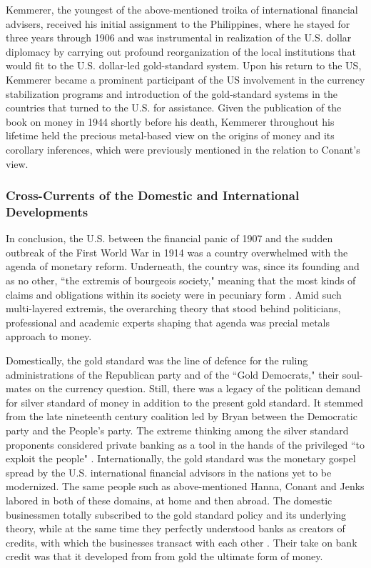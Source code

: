Kemmerer, the youngest of the above-mentioned troika of international financial advisers, received his initial assignment to the Philippines, where he stayed for three years through 1906 and was instrumental in realization of the U.S. dollar diplomacy by carrying out profound reorganization of the local institutions that would fit to the U.S. dollar-led gold-standard system. Upon his return to the US, Kemmerer became a prominent participant of the US involvement in the currency stabilization programs and introduction of the gold-standard systems in the countries that turned to the U.S. for assistance. Given the publication of the book on money in 1944  shortly before his death, Kemmerer throughout his lifetime held the precious metal-based view on the origins of money and its corollary inferences, which were previously mentioned in the relation to Conant's view.

\subsubsection*{Cross-Currents of the Domestic and International Developments}

In conclusion, the U.S. between the financial panic of 1907 and the sudden outbreak of the First World War in 1914 was a country overwhelmed with the agenda of monetary reform. Underneath, the country was, since its founding and as no other, ``the extremis of bourgeois society," meaning that the most kinds of claims and obligations within its society were in pecuniary form \citep[p.~9]{livingston1989}. Amid such multi-layered extremis, the overarching theory that stood behind politicians, professional and academic experts shaping that agenda was precial metals approach to money. 

Domestically, the gold standard was the line of defence for the ruling administrations of the Republican party and of the ``Gold Democrats," their soul-mates on the currency question. Still, there was a legacy of the politican demand for silver standard of money in addition to the present gold standard. It stemmed from the late nineteenth century coalition led by Bryan between the Democratic party and the People's party. The extreme thinking among the silver standard proponents considered private banking as a tool in the hands of the privileged ``to exploit the people" \citep[p.~364]{gage1908}. Internationally, the gold standard was the monetary gospel spread by the U.S. international financial advisors in the nations yet to be modernized. The same people such as above-mentioned Hanna, Conant and Jenks labored in both of these domains, at home and then abroad. The domestic businessmen totally subscribed to the gold standard policy and its underlying theory, while at the same time they perfectly understood banks as creators of credits, with which the businesses transact with each other \citep{morawetz1908,morawetz1909,gage1908,roberts1909}. Their take on bank credit was that it developed from from gold the ultimate form of money. 

